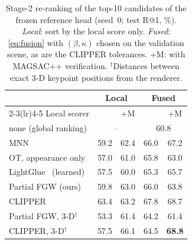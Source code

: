 \begin{table}[t]
\centering
\caption{Stage-2 re-ranking of the top-10 candidates of the frozen reference head (seed~0; test R@1, \%). \emph{Local}: sort by the local score only. \emph{Fused}: \cref{eq:fusion} with $(\beta,\kappa)$ chosen on the validation scene, as are the CLIPPER tolerances. +M: with MAGSAC++ verification. $^\dagger$Distances between exact 3-D keypoint positions from the renderer.}
\label{tab:rerank}
\footnotesize
\setlength{\tabcolsep}{3pt}
\begin{tabular}{@{}lcccc@{}}
\toprule
& \multicolumn{2}{c}{Local} & \multicolumn{2}{c}{Fused} \\
\cmidrule(lr){2-3}\cmidrule(lr){4-5}
Local scorer & & +M & & +M \\
\midrule
none (global ranking) & \multicolumn{2}{c}{--} & \multicolumn{2}{c}{60.8} \\
MNN & 59.2 & 62.4 & 66.0 & 67.2 \\
OT, appearance only & 57.0 & 61.0 & 65.8 & 63.0 \\
LightGlue~\cite{lindenberger2023lightglue} (learned) & 57.5 & 60.0 & 65.3 & 65.7 \\
Partial FGW (ours) & 59.8 & 63.0 & 66.0 & 63.8 \\
CLIPPER~\cite{lusk2021clipper} & 63.4 & 63.2 & 67.8 & 68.7 \\
\midrule
Partial FGW, 3-D$^\dagger$ & 53.3 & 61.4 & 64.2 & 61.4 \\
CLIPPER, 3-D$^\dagger$ & 57.5 & 66.1 & 64.5 & \textbf{68.8} \\
\bottomrule
\end{tabular}
\end{table}
